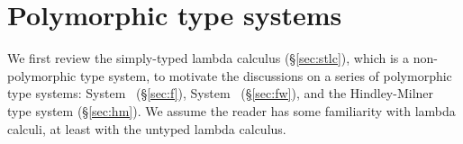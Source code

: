 \chapter{Polymorphic type systems}\label{ch:poly}
We first review the simply-typed lambda calculus (\S\ref{sec:stlc}),
which is a non-polymorphic type system, to motivate the discussions
on a series of polymorphic type systems: System \F\ (\S\ref{sec:f}),
System \Fw\ (\S\ref{sec:fw}), and the Hindley-Milner type system
(\S\ref{sec:hm}). We assume the reader has some familiarity with
lambda calculi, at least with the untyped lambda calculus.


